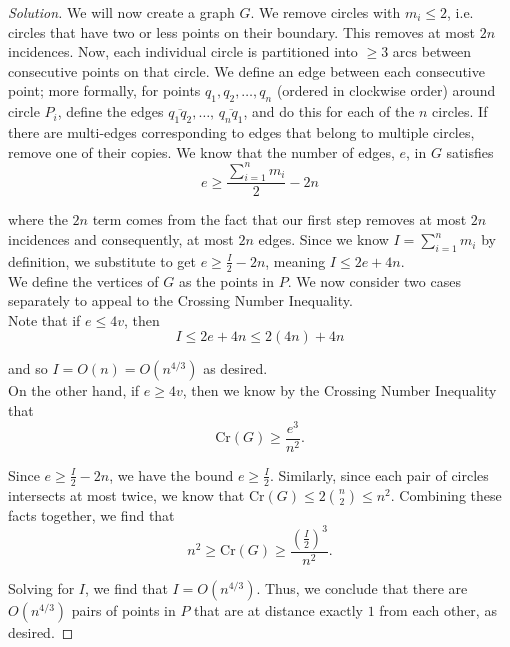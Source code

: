 \documentclass[11pt]{article}
\newenvironment{solution}
  {\renewcommand\qedsymbol{$\blacksquare$}\begin{proof}[Solution]}
  {\end{proof}}
\begin{document}
\begin{enumerate}
\begin{solution}
    We will now create a graph $G$. We remove circles with $m_i \leq 2$, i.e. circles that have two or less points on their boundary. This removes at most $2n$ incidences. Now, each individual circle is partitioned into $\geq 3$ arcs between consecutive points on that circle. We define an edge between each consecutive point; more formally, for points $q_1, q_2, \dots, q_n$ (ordered in clockwise order) around circle $P_i$, define the edges $\overline{q_1q_2}, \dots, \, \overline{q_nq_1}$, and do this for each of the $n$ circles. If there are multi-edges corresponding to edges that belong to multiple circles, remove one of their copies. We know that the number of edges, $e$, in $G$ satisfies
    \[ e \geq \frac{\sum\limits_{i=1}^n m_i}{2} - 2n\]

    where the $2n$ term comes from the fact that our first step removes at most $2n$ incidences and consequently, at most $2n$ edges. Since we know $I = \sum\limits_{i=1}^{n} m_i$ by definition, we substitute to get $e \geq \frac{I}{2} - 2n$, meaning $I \leq 2e + 4n.$ \\

    We define the vertices of $G$ as the points in $P$. We now consider two cases separately to appeal to the Crossing Number Inequality. \\

    Note that if $e \leq 4v$, then 
    \[ I \leq 2e + 4n \leq 2(4n) + 4n\]

    and so $I = O(n) = O(n^{4/3})$ as desired. \\
    
    On the other hand, if $e \geq 4v$, then we know by the Crossing Number Inequality that
    \[ \mathrm{Cr}(G) \geq \frac{e^3}{n^2}.\]

    Since $e \geq \frac{I}{2} - 2n$, we have the bound $e \geq \frac{I}{2}$. Similarly, since each pair of circles intersects at most twice, we know that $\mathrm{Cr}(G) \leq 2\binom{n}{2} \leq n^2.$ Combining these facts together, we find that
    \[ n^2 \geq \mathrm{Cr}(G) \geq \frac{\left(\frac{I}{2}\right)^3}{n^2}.\]

    Solving for $I$, we find that $I = O(n^{4/3})$. Thus, we conclude that there are $O(n^{4/3})$ pairs of points in $P$ that are at distance exactly $1$ from each other, as desired. \end{solution}

    

    


\end{enumerate}
\end{document}
